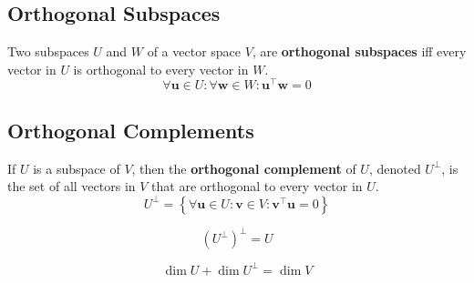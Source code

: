 \documentclass{article}
\begin{document}
\subsection{Orthogonal Subspaces}
\begin{definition}
    Two subspaces \(U\) and \(W\) of a vector space \(V\), are
    \textbf{orthogonal subspaces} iff every vector in \(U\) is
    orthogonal to every vector in \(W\).
    \begin{equation*}
        \forall \symbf{u}\in U:\forall \symbf{w}\in W:\symbf{u}^{\top}\symbf{w}=0
    \end{equation*}
\end{definition}
\subsection{Orthogonal Complements}
\begin{definition}
    If \(U\) is a subspace of \(V\), then the
    \textbf{orthogonal complement} of \(U\), denoted \(U^{\perp}\), is
    the set of all vectors in \(V\) that are orthogonal to every vector
    in \(U\).
    \begin{equation*}
        U^{\perp} = \left\{ \forall \symbf{u}\in U:\symbf{v}\in V: \symbf{v}^{\top}\symbf{u}=0 \right\}
    \end{equation*}
\end{definition}
\begin{theorem}
    \begin{equation*}
        \left( U^{\perp} \right)^{\perp}=U
    \end{equation*}
\end{theorem}
\begin{theorem}
    \begin{equation*}
        \dim{U} + \dim{U^{\perp}} = \dim{V}
    \end{equation*}
\end{theorem}
\end{document}

